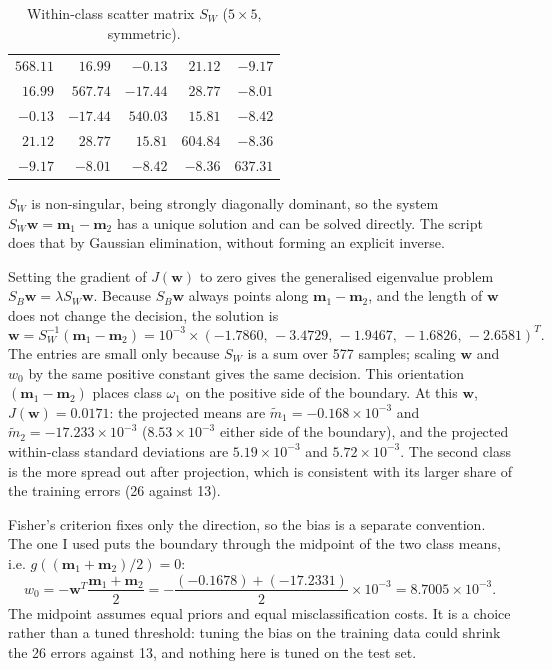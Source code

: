 \begin{table}[htbp]
\centering
\footnotesize
\caption{Within-class scatter matrix $S_W$ ($5\times 5$, symmetric).}
\begin{tabular}{@{}rrrrr@{}}
\toprule
$568.11$ & $16.99$ & $-0.13$ & $21.12$ & $-9.17$ \\
$16.99$ & $567.74$ & $-17.44$ & $28.77$ & $-8.01$ \\
$-0.13$ & $-17.44$ & $540.03$ & $15.81$ & $-8.42$ \\
$21.12$ & $28.77$ & $15.81$ & $604.84$ & $-8.36$ \\
$-9.17$ & $-8.01$ & $-8.42$ & $-8.36$ & $637.31$ \\
\bottomrule
\end{tabular}
\end{table}

$S_W$ is non-singular, being strongly diagonally dominant, so the system $S_W\mathbf{w} = \mathbf{m}_1-\mathbf{m}_2$ has a
unique solution and can be solved directly. The script does that by Gaussian elimination, without forming an explicit inverse.

Setting the gradient of $J(\mathbf{w})$ to zero gives the generalised eigenvalue problem
$S_B\mathbf{w} = \lambda S_W\mathbf{w}$. Because $S_B\mathbf{w}$ always points along $\mathbf{m}_1-\mathbf{m}_2$, and the length
of $\mathbf{w}$ does not change the decision, the solution is
\[
\mathbf{w} = S_W^{-1}(\mathbf{m}_1-\mathbf{m}_2)
= 10^{-3}\times(-1.7860,\, -3.4729,\, -1.9467,\, -1.6826,\, -2.6581)^T .
\]
The entries are small only because $S_W$ is a sum over 577 samples; scaling $\mathbf{w}$ and $w_0$ by the same positive
constant gives the same decision. This orientation $(\mathbf{m}_1-\mathbf{m}_2)$ places class $\omega_1$ on the positive side of
the boundary. At this $\mathbf{w}$, $J(\mathbf{w}) = 0.0171$: the projected means are
$\tilde{m}_1 = -0.168\times10^{-3}$ and $\tilde{m}_2 = -17.233\times10^{-3}$
($8.53\times10^{-3}$ either side of the boundary), and the projected within-class standard deviations are $5.19\times10^{-3}$ and
$5.72\times10^{-3}$. The second class is the more spread out after projection, which is consistent with its larger share of the
training errors (26 against 13).

Fisher's criterion fixes only the direction, so the bias is a separate convention. The one I used puts the boundary through the
midpoint of the two class means, i.e. $g((\mathbf{m}_1+\mathbf{m}_2)/2) = 0$:
\[
w_0 = -\mathbf{w}^T\frac{\mathbf{m}_1+\mathbf{m}_2}{2}
= -\frac{(-0.1678)+(-17.2331)}{2}\times10^{-3} = 8.7005\times10^{-3} .
\]
The midpoint assumes equal priors and equal misclassification costs. It is a choice rather than a tuned threshold: tuning the
bias on the training data could shrink the 26 errors against 13, and nothing here is tuned on the test set.

